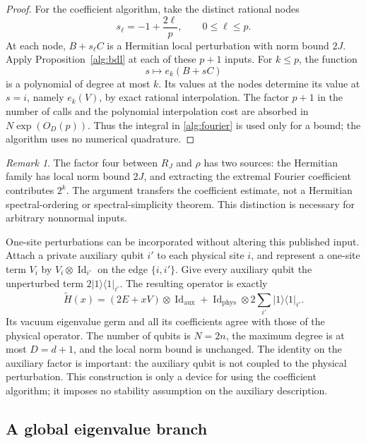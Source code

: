 \documentclass[reqno]{amsart}
\theoremstyle{definition}
\theoremstyle{remark}
\newtheorem{remark}[theorem]{Remark}
\DeclareMathOperator{\Id}{Id}
\begin{document}
\begin{proof}
For the coefficient algorithm, take the distinct rational nodes
\[
 s_\ell=-1+\frac{2\ell}{p},\qquad 0\le\ell\le p.
 \]
At each node, \(B+s_\ell C\) is a Hermitian local perturbation
with norm bound \(2J\).  Apply
Proposition~\ref{alg:bdl} at each of these \(p+1\) inputs.
For \(k\le p\), the function
\[
 s\longmapsto e_k(B+sC)
 \]
is a polynomial of degree at most \(k\).
Its values at the nodes determine its value at \(s=i\), namely
\(e_k(V)\), by exact rational interpolation.
The factor \(p+1\) in the number of calls and the polynomial
interpolation cost are absorbed in \(N\exp(O_D(p))\).
Thus the integral in \eqref{alg:fourier} is used only for a bound;
the algorithm uses no numerical quadrature.
\end{proof}

\begin{remark}
\label{alg:complexification-scope}
The factor four between \(R_J\) and \(\rho\) has two sources:
the Hermitian family has local norm bound \(2J\), and extracting
the extremal Fourier coefficient contributes \(2^k\).
The argument transfers the coefficient estimate, not a Hermitian
spectral-ordering or spectral-simplicity theorem.  This distinction
is necessary for arbitrary nonnormal inputs.
\end{remark}

One-site perturbations can be incorporated without altering this
published input.  Attach a private auxiliary qubit \(i'\) to each
physical site \(i\), and represent a one-site term \(V_i\) by
\(V_i\otimes\Id_{i'}\) on the edge \(\{i,i'\}\).
Give every auxiliary qubit the unperturbed term
\(2|1\rangle\langle1|_{i'}\).  The resulting operator is exactly
\begin{equation}
 \widetilde H(x)
  =(2E+xV)\otimes\Id_{\mathrm{aux}}
   +\Id_{\mathrm{phys}}\otimes
        2\sum_{i'}|1\rangle\langle1|_{i'}.
 \label{alg:auxiliary}
\end{equation}
Its vacuum eigenvalue germ and all its coefficients agree with
those of the physical operator.
The number of qubits is \(N=2n\), the maximum degree is at most
\(D=d+1\), and the local norm bound is unchanged.
The identity on the auxiliary factor is important: the auxiliary
qubit is not coupled to the physical perturbation.
This construction is only a device for using the coefficient
algorithm; it imposes no stability assumption on the auxiliary
description.

\subsection{A global eigenvalue branch}
\label{alg:branch-subsection}
\end{document}
